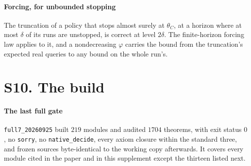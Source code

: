 \paragraph{Forcing, for unbounded stopping} The truncation of a policy that stops almost surely
at $\theta_C$, at a horizon where at most $\delta$ of its runs are unstopped, is correct at level
$2\delta$. The finite-horizon forcing law applies to it, and a nondecreasing $\varphi$ carries the
bound from the truncation's expected real queries to any bound on the whole run's.

\section{S10. The build}

\paragraph{The last full gate} \texttt{full7\_20260925} built $219$ modules and audited $1704$
theorems, with exit status $0$, no \texttt{sorry}, no \texttt{native\_decide}, every axiom closure
within the standard three, and frozen sources byte-identical to the working copy afterwards.
It covers every module cited in the paper and in this supplement except the thirteen listed next.

